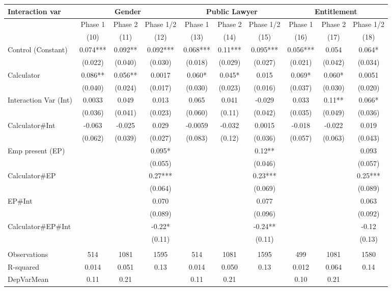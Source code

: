 \begin{tabular}{lccccccccc}
\toprule
Interaction var & \multicolumn{3}{c}{Gender} & \multicolumn{3}{c}{Public Lawyer} & \multicolumn{3}{c}{Entitlement} \\
\midrule
\midrule
      & Phase 1 & Phase 2 & Phase 1/2 & Phase 1 & Phase 2 & Phase 1/2 & Phase 1 & Phase 2 & Phase 1/2 \\
\midrule
      & (10)  & (11)  & (12)  & (13)  & (14)  & (15)  & (16)  & (17)  & (18) \\
\midrule
\midrule
Control (Constant) & 0.074*** & 0.092** & 0.092*** & 0.068*** & 0.11*** & 0.095*** & 0.056*** & 0.054 & 0.064* \\
      & (0.022) & (0.040) & (0.030) & (0.018) & (0.029) & (0.027) & (0.021) & (0.042) & (0.034) \\
Calculator & 0.086** & 0.056** & 0.0017 & 0.060* & 0.045* & 0.015 & 0.069* & 0.060* & 0.0051 \\
      & (0.040) & (0.024) & (0.017) & (0.030) & (0.023) & (0.016) & (0.037) & (0.030) & (0.020) \\
Interaction Var (Int) & 0.0033 & 0.049 & 0.013 & 0.065 & 0.041 & -0.029 & 0.033 & 0.11** & 0.066* \\
      & (0.036) & (0.041) & (0.023) & (0.060) & (0.11) & (0.042) & (0.035) & (0.049) & (0.036) \\
Calculator\#Int & -0.063 & -0.025 & 0.029 & -0.0059 & -0.032 & 0.0015 & -0.018 & -0.022 & 0.019 \\
      & (0.062) & (0.039) & (0.027) & (0.083) & (0.12) & (0.036) & (0.057) & (0.063) & (0.043) \\
Emp present (EP) &       &       & 0.095* &       &       & 0.12** &       &       & 0.093 \\
      &       &       & (0.055) &       &       & (0.046) &       &       & (0.057) \\
Calculator\#EP   &       &       & 0.27*** &       &       & 0.23*** &       &       & 0.25*** \\
      &       &       & (0.064) &       &       & (0.069) &       &       & (0.089) \\
EP\#Int &       &       & 0.070 &       &       & 0.077 &       &       & 0.063 \\
      &       &       & (0.089) &       &       & (0.096) &       &       & (0.092) \\
Calculator\#EP\#Int &       &       & -0.22* &       &       & -0.24** &       &       & -0.12 \\
      &       &       & (0.11) &       &       & (0.11) &       &       & (0.13) \\
      &       &       &       &       &       &       &       &       &  \\
Observations & 514   & 1081  & 1595  & 514   & 1081  & 1595  & 499   & 1081  & 1580 \\
R-squared & 0.014 & 0.051 & 0.13  & 0.014 & 0.050 & 0.13  & 0.012 & 0.064 & 0.14 \\
DepVarMean & 0.11  & 0.21  &       & 0.11  & 0.21  &       & 0.10  & 0.21  &  \\
\bottomrule
\bottomrule
\end{tabular}%
